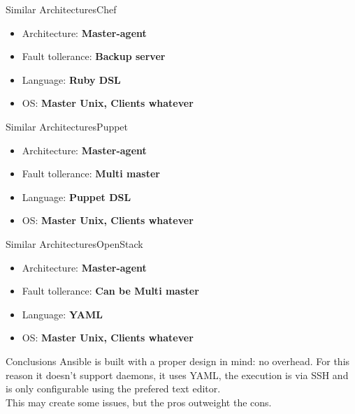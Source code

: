 \documentclass[10pt]{beamer}
\begin{document}
\begin{frame}[fragile]{Similar Architectures}{Chef}
\begin{itemize}
    \item Architecture: \textbf{Master-agent}
    \item Fault tollerance: \textbf{Backup server}
    \item Language: \textbf{Ruby DSL}
    \item OS:\textbf{ Master Unix, Clients whatever}
\end{itemize}
\end{frame}


\begin{frame}[fragile]{Similar Architectures}{Puppet}
\begin{itemize}
    \item Architecture: \textbf{Master-agent}
    \item Fault tollerance:\textbf{ Multi master}
    \item Language: \textbf{Puppet DSL}
    \item OS: \textbf{Master Unix, Clients whatever}
\end{itemize}
\end{frame}



\begin{frame}[fragile]{Similar Architectures}{OpenStack}
\begin{itemize}
    \item Architecture: \textbf{Master-agent}
    \item Fault tollerance: \textbf{Can be Multi master}
    \item Language: \textbf{YAML}
    \item OS: \textbf{Master Unix, Clients whatever}
\end{itemize}
\end{frame}

\begin{frame}[fragile]{Conclusions}
Ansible is built with a proper design in mind: no overhead.  For this reason it doesn't support daemons, it uses YAML, the execution is via SSH and is only configurable using the prefered text editor. \\
This may create some issues, but the pros outweight the cons.
\end{frame}
\end{document}
